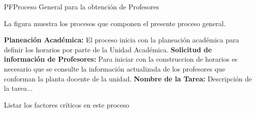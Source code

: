 \begin{Proceso}{PF}{Proceso General para la obtención de Profesores}{
	}
{	}
\end{Proceso}

	La figura  muestra los procesos que componen el presente proceso general.



\begin{PDescripcion}
	\Ppaso[\PSubProceso] \textbf{Planeación Académica:} El proceso inicia con la planeación académica para definir los horarios por parte de la Unidad Académica.  
	\Ppaso[\itarea] \textbf{Solicitud de información de Profesores:} Para iniciar con la construccion de horarios es necesario que se consulte la información actualizada de los profesores que conforman la planta docente de la unidad.
	\Ppaso[\Einicio] \textbf{Nombre de la Tarea:} Descripción de la tarea...
\end{PDescripcion}

\begin{FCDescripcion}
	\FCpaso Listar los factores críticos en este proceso
\end{FCDescripcion}








